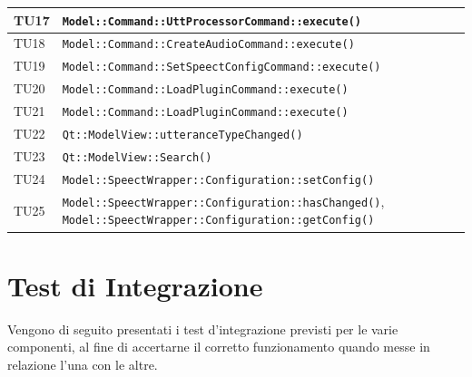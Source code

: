 \documentclass[openany,12pt,a4paper]{report}
\begin{document}
\begin{longtable}[c]{| p{2.5cm} |p{11cm}|}
	\\[1em]
	\hline
	TU17&
	\verb|Model::Command::UttProcessorCommand::execute()|
	\\[1em]
	\hline
	TU18&
	\verb|Model::Command::CreateAudioCommand::execute()|
	\\[1em]
	\hline
	TU19&
	\verb|Model::Command::SetSpeectConfigCommand::execute()|
	\\[1em]
	\hline
	TU20&
	\verb|Model::Command::LoadPluginCommand::execute()|
	\\[1em]
	\hline
	TU21&
	\verb|Model::Command::LoadPluginCommand::execute()|
	\\[1em]
	\hline
	TU22&
	\verb|Qt::ModelView::utteranceTypeChanged()|
	\\[1em]
	\hline
	TU23&
	\verb|Qt::ModelView::Search()|
	\\[1em]
	\hline
	TU24&
	\verb|Model::SpeectWrapper::Configuration::setConfig()|
	\\[1em]
	\hline
	TU25&
	\verb|Model::SpeectWrapper::Configuration::hasChanged()|,
	\verb|Model::SpeectWrapper::Configuration::getConfig()|
	\\[1em]
	\hline
\end{longtable}

\section{Test di Integrazione}

Vengono di seguito presentati i test d'integrazione previsti per le varie componenti, al fine di accertarne il corretto funzionamento quando messe in relazione l'una con le altre.
\end{document}
